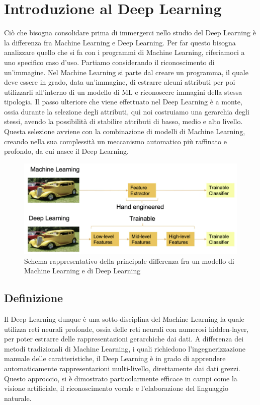\chapter{Introduzione al Deep Learning}

Ciò che bisogna consolidare prima di immergerci nello studio del Deep Learning è la differenza fra Machine Learning e Deep Learning. Per far questo bisogna analizzare quello che si fa con i programmi di Machine Learning, riferiamoci a uno specifico caso d'uso. Partiamo considerando il riconoscimento di un'immagine. Nel Machine Learning si parte dal creare un programma, il quale deve essere in grado, data un'immagine, di estrarre alcuni attributi per poi utilizzarli all'interno di un modello di ML e riconoscere immagini della stessa tipologia. Il passo ulteriore che viene effettuato nel Deep Learning è a monte, ossia durante la selezione degli attributi, quì noi costruiamo una gerarchia degli stessi, avendo la possibilità di stabilire attributi di basso, medio e alto livello. Questa selezione avviene con la combinazione di modelli di Machine Learning, creando nella sua complessità un meccanismo automatico più raffinato e profondo, da cui nasce il Deep Learning.

\begin{figure}
    \centering
    \includegraphics[width=0.75\linewidth]{figure/DeepMachineDiff.png}
    \caption{Schema rappresentativo della principale differenza fra un modello di Machine Learning e di Deep Learning}
    \label{fig:DLMLDiff}
\end{figure}

\section{Definizione}
Il Deep Learning dunque è una sotto-disciplina del Machine Learning la quale utilizza reti neurali profonde, ossia delle reti neurali con numerosi hidden-layer, per poter estrarre delle rappresentazioni gerarchiche dai dati. A differenza dei metodi tradizionali di Machine Learning, i quali richiedono l'ingegnerizzazione manuale delle caratteristiche, il Deep Learning è in grado di apprendere automaticamente rappresentazioni multi-livello, direttamente dai dati grezzi. Questo approccio, si è dimostrato particolarmente efficace in campi come la visione artificiale, il riconoscimento vocale e l'elaborazione del linguaggio naturale.

